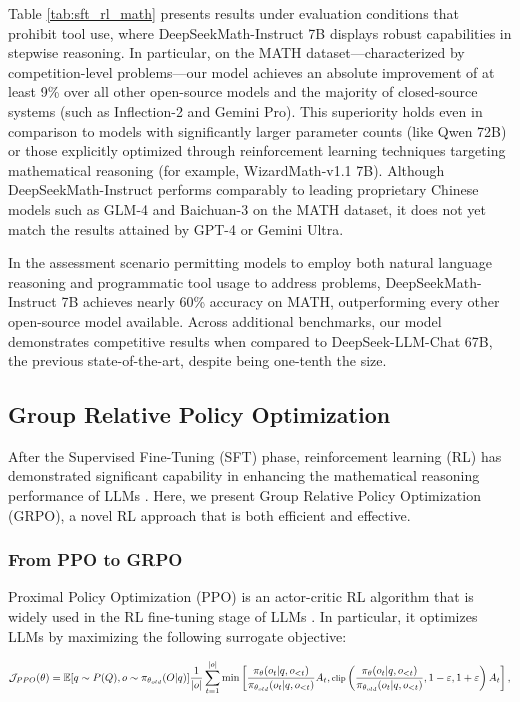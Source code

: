\begin{itemize}[topsep=0pt]
\begin{itemize}[topsep=0pt]
Table \ref{tab:sft_rl_math} presents results under evaluation conditions that prohibit tool use, where DeepSeekMath-Instruct 7B displays robust capabilities in stepwise reasoning. In particular, on the MATH dataset—characterized by competition-level problems—our model achieves an absolute improvement of at least 9\% over all other open-source models and the majority of closed-source systems (such as Inflection-2 and Gemini Pro). This superiority holds even in comparison to models with significantly larger parameter counts (like Qwen 72B) or those explicitly optimized through reinforcement learning techniques targeting mathematical reasoning (for example, WizardMath-v1.1 7B). Although DeepSeekMath-Instruct performs comparably to leading proprietary Chinese models such as GLM-4 and Baichuan-3 on the MATH dataset, it does not yet match the results attained by GPT-4 or Gemini Ultra.

In the assessment scenario permitting models to employ both natural language reasoning and programmatic tool usage to address problems, DeepSeekMath-Instruct 7B achieves nearly 60\% accuracy on MATH, outperforming every other open-source model available. Across additional benchmarks, our model demonstrates competitive results when compared to DeepSeek-LLM-Chat 67B, the previous state-of-the-art, despite being one-tenth the size.

\subsection{Group Relative Policy Optimization} After the Supervised Fine-Tuning (SFT) phase, reinforcement learning (RL) has demonstrated significant capability in enhancing the mathematical reasoning performance of LLMs \citep{wang2023math,wizardmath}. Here, we present Group Relative Policy Optimization (GRPO), a novel RL approach that is both efficient and effective.

\subsubsection{From PPO to GRPO} Proximal Policy Optimization (PPO) \citep{schulman2017proximal} is an actor-critic RL algorithm that is widely used in the RL fine-tuning stage of LLMs \citep{ouyang2022training}. In particular, it optimizes LLMs by maximizing the following surrogate objective:

\begin{equation}
\footnotesize
    \mathcal{J}_{PPO}(\theta) = \mathbb{E}{[q \sim P(Q), o \sim \pi_{\theta_{old}}(O|q)]} \frac{1}{|o|} \sum_{t=1}^{|o|} \min \left[ \frac{\pi_\theta(o_{t} | q, o_{<t})}{\pi_{\theta_{old}}(o_{t} | q, o_{<t})} A_{t}, \text{clip} \left( \frac{\pi_\theta(o_{t} | q, o_{<t})}{\pi_{\theta_{old}}(o_{t} | q, o_{<t})}, 1 - \varepsilon, 1 + \varepsilon \right)  A_{t} \right] ,
\end{equation}


\end{itemize}
\end{itemize}
